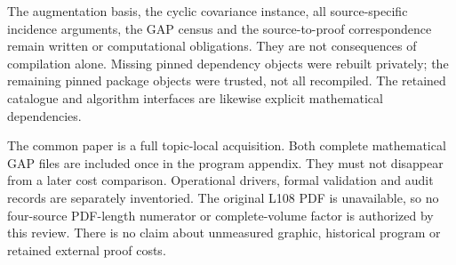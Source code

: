 \documentclass[11pt]{article}
\begin{document}
The augmentation basis, the cyclic covariance instance, all source-specific
incidence arguments, the GAP census and the source-to-proof correspondence
remain written or computational obligations. They are not consequences of
compilation alone. Missing pinned dependency objects were rebuilt privately;
the remaining pinned package objects were trusted, not all recompiled. The
retained catalogue and algorithm interfaces are likewise explicit mathematical
dependencies.

The common paper is a full topic-local acquisition. Both complete mathematical
GAP files are included once in the program appendix. They must not disappear
from a later cost comparison. Operational drivers, formal validation and audit
records are separately inventoried. The original L108 PDF is unavailable, so
no four-source PDF-length numerator or complete-volume factor is authorized by
this review. There is no claim about unmeasured graphic, historical program or
retained external proof costs.
\end{document}
